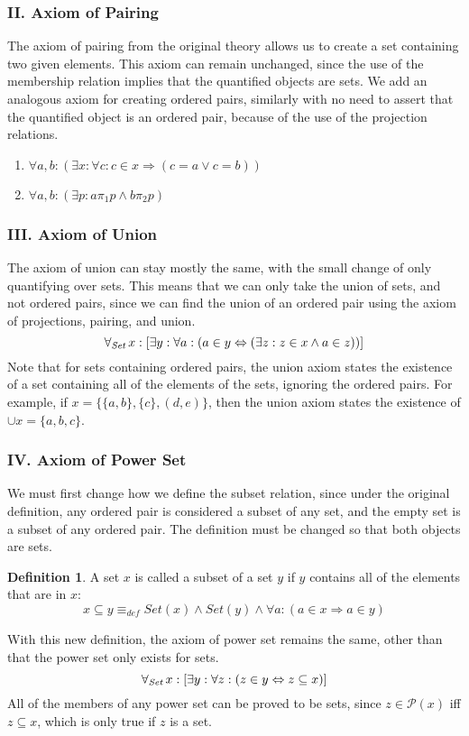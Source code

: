 \documentclass[11pt]{article}
\newcommand{\all}[1]{\forall_{\mathit{#1}}\hspace{0.5mm}}
\newcommand{\eqdef}{\equiv_\mathit{def}}
\newcommand{\pleft}{\mathrel{\pi_1}}
\newcommand{\pright}{\mathrel{\pi_2}}
\theoremstyle{definition}
\theoremstyle{theorem}
\theoremstyle{lemma}
\newtheorem{definition}{Definition}[section]
\begin{document}
\subsubsection*{II. Axiom of Pairing}
The axiom of pairing from the original theory allows us to create a set containing two given elements.
This axiom can remain unchanged, since the use of the membership relation implies that the quantified objects are sets.
We add an analogous axiom for creating ordered pairs, similarly with no need to assert that the quantified object is an ordered pair, because of the use of the projection relations.
\begin{enumerate}[label=(\roman*)]
\item $\forall a,b: (\exists x: \forall c:
          c\in x \Rightarrow (c=a \vee c=b))$
\item $\forall a,b: (\exists p: a\pleft p \wedge b\pright p)$
\end{enumerate}

\subsubsection*{III. Axiom of Union}
The axiom of union can stay mostly the same, with the small change of only quantifying over sets.
This means that we can only take the union of sets, and not ordered pairs, since we can find the union of an ordered pair using the axiom of projections, pairing, and union.
$$\all{Set}x: [\exists y:\forall a:
    (a\in y \Leftrightarrow (\exists z: z\in x \wedge a\in z))]$$
Note that for sets containing ordered pairs, the union axiom states the existence of a set containing all of the elements of the sets, ignoring the ordered pairs.
For example, if $x=\{\{a,b\},\{c\},(d,e)\}$, then the union axiom states the existence of $\cup x=\{a,b,c\}$.

\subsubsection*{IV. Axiom of Power Set}
We must first change how we define the subset relation, since under the original definition, any ordered pair is considered a subset of any set, and the empty set is a subset of any ordered pair.
The definition must be changed so that both objects are sets.
\begin{definition} A set $x$ is called a subset of a set $y$ if $y$ contains all of the elements that are in $x$:
$$x\subseteq y \eqdef \mathit{Set}(x) \wedge
               \mathit{Set}(y) \wedge
                \forall a: (a\in x \Rightarrow a\in y)$$
\end{definition}
\noindent
With this new definition, the axiom of power set remains the same, other than that the power set only exists for sets.
$$\all{Set}x: [\exists y:\forall z:
    (z\in y \Leftrightarrow z\subseteq x)]$$
All of the members of any power set can be proved to be sets, since $z\in \mathcal{P}(x)$ iff $z\subseteq x$, which is only true if $z$ is a set.
\end{document}
